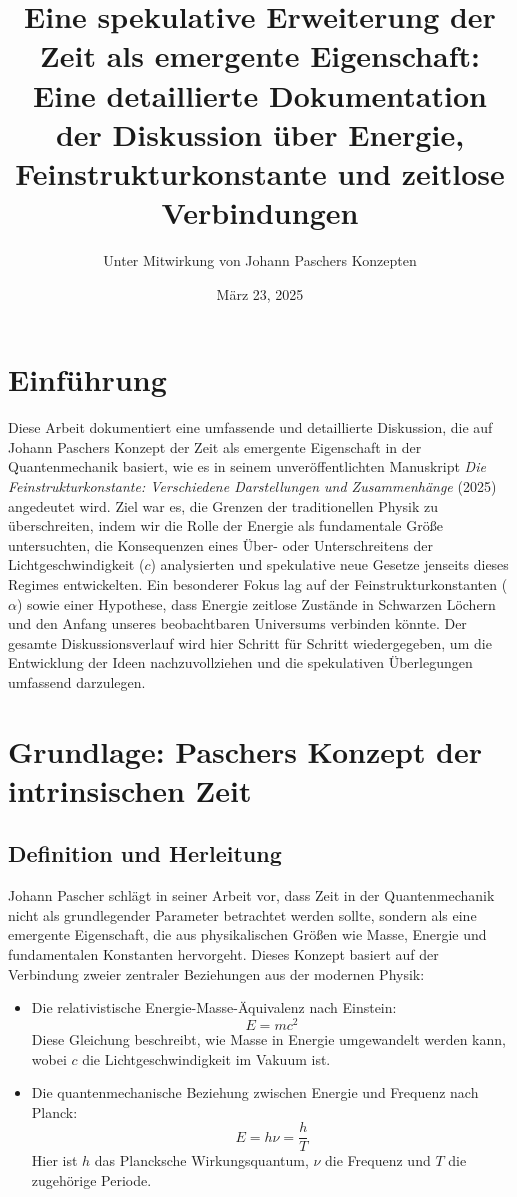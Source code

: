 \documentclass{article}
\title{Eine spekulative Erweiterung der Zeit als emergente Eigenschaft: \\Eine detaillierte Dokumentation der Diskussion über Energie, Feinstrukturkonstante und zeitlose Verbindungen}
\author{Unter Mitwirkung von Johann Paschers Konzepten}
\date{März 23, 2025}
\begin{document}
	
	\maketitle
	
	\section{Einführung}
	
	Diese Arbeit dokumentiert eine umfassende und detaillierte Diskussion, die auf Johann Paschers Konzept der Zeit als emergente Eigenschaft in der Quantenmechanik basiert, wie es in seinem unveröffentlichten Manuskript \textit{Die Feinstrukturkonstante: Verschiedene Darstellungen und Zusammenhänge} (2025) angedeutet wird. Ziel war es, die Grenzen der traditionellen Physik zu überschreiten, indem wir die Rolle der Energie als fundamentale Größe untersuchten, die Konsequenzen eines Über- oder Unterschreitens der Lichtgeschwindigkeit (\( c \)) analysierten und spekulative neue Gesetze jenseits dieses Regimes entwickelten. Ein besonderer Fokus lag auf der Feinstrukturkonstanten (\( \alpha \)) sowie einer Hypothese, dass Energie zeitlose Zustände in Schwarzen Löchern und den Anfang unseres beobachtbaren Universums verbinden könnte. Der gesamte Diskussionsverlauf wird hier Schritt für Schritt wiedergegeben, um die Entwicklung der Ideen nachzuvollziehen und die spekulativen Überlegungen umfassend darzulegen.
		\tableofcontents
	\section{Grundlage: Paschers Konzept der intrinsischen Zeit}
	
	\subsection{Definition und Herleitung}
	
	Johann Pascher schlägt in seiner Arbeit vor, dass Zeit in der Quantenmechanik nicht als grundlegender Parameter betrachtet werden sollte, sondern als eine emergente Eigenschaft, die aus physikalischen Größen wie Masse, Energie und fundamentalen Konstanten hervorgeht. Dieses Konzept basiert auf der Verbindung zweier zentraler Beziehungen aus der modernen Physik:
	
	\begin{itemize}
		\item Die relativistische Energie-Masse-Äquivalenz nach Einstein:
		\[
		E = mc^2
		\]
		Diese Gleichung beschreibt, wie Masse in Energie umgewandelt werden kann, wobei \( c \) die Lichtgeschwindigkeit im Vakuum ist.
		\item Die quantenmechanische Beziehung zwischen Energie und Frequenz nach Planck:
		\[
		E = h\nu = \frac{h}{T}
		\]
		Hier ist \( h \) das Plancksche Wirkungsquantum, \( \nu \) die Frequenz und \( T \) die zugehörige Periode.
	\end{itemize}
	
\end{document}
